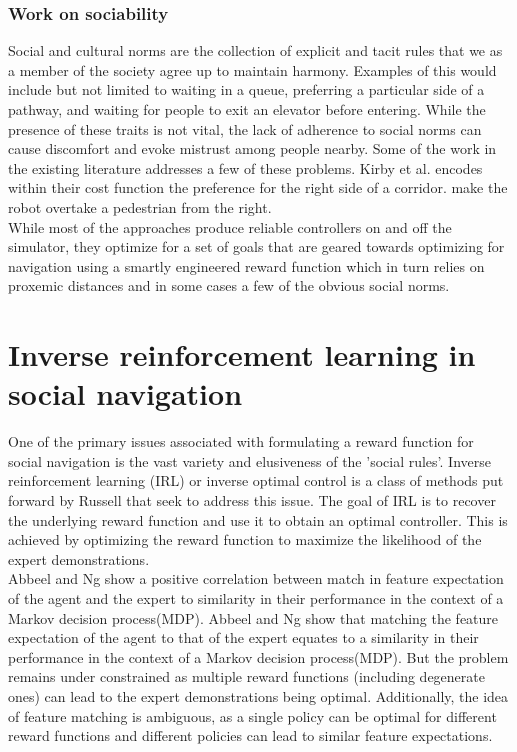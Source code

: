 \subsubsection{Work on sociability}
Social and cultural norms are the collection of explicit and tacit rules that we as a member of the society agree up to maintain harmony. Examples of this would include but not limited to waiting in a queue, preferring a particular side of a pathway, and waiting for people to exit an elevator before entering. While the presence of these traits is not vital, the lack of adherence to social norms can cause discomfort and evoke mistrust among people nearby. Some of the work in the existing literature addresses a few of these problems. Kirby et al. \cite{kriby_companion_2009} encodes within their cost function the preference for the right side of a corridor. \cite{pandey_alami_robot_guide_2009} make the robot overtake a pedestrian from the right.\\

While most of the approaches produce reliable controllers on and off the simulator, they optimize for a set of goals that are geared towards optimizing for navigation using a smartly engineered reward function which in turn relies on proxemic distances and in some cases a few of the obvious social norms.\\

\section{Inverse reinforcement learning in social navigation}
One of the primary issues associated with formulating a reward function for social navigation is the vast variety and elusiveness of the 'social rules'. Inverse reinforcement learning (IRL) or inverse optimal control is a class of methods put forward by Russell \cite{russel_irl_1998} that seek to address this issue. The goal of IRL is to recover the underlying reward function and use it to obtain an optimal controller. This is achieved by optimizing the reward function to maximize the likelihood of the expert demonstrations.\\
Abbeel and Ng \cite{abbeel_apprenticeshiplearning_2004} show a positive correlation between match in feature expectation of the agent and the expert to similarity in their performance in the context of a Markov decision process(MDP).
Abbeel and Ng \cite{abbeel_apprenticeshiplearning_2004} show that matching the feature expectation of the agent to that of the expert equates to a similarity in their performance in the context of a Markov decision process(MDP). But the problem remains under constrained as multiple reward functions (including degenerate ones) can lead to the expert demonstrations being optimal. Additionally, the idea of feature matching is ambiguous, as a single policy can be optimal for different reward functions and different policies can lead to similar feature expectations. \\

